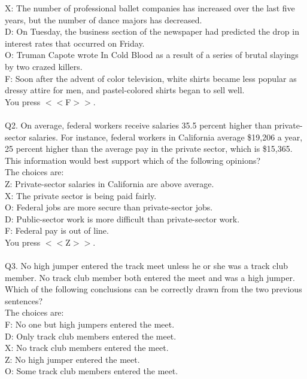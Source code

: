 \documentclass[pdflatex,sn-nature]{sn-jnl}%
\theoremstyle{thmstyleone}%
\theoremstyle{thmstyletwo}%
\theoremstyle{thmstylethree}%
\begin{document}
X: The number of professional ballet companies has increased over the last five years, but the number of dance majors has decreased. $~$\\ 
D: On Tuesday, the business section of the newspaper had predicted the drop in interest rates that occurred on Friday. $~$\\ 
O: Truman Capote wrote In Cold Blood as a result of a series of brutal slayings by two crazed killers. $~$\\ 
F: Soon after the advent of color television, white shirts became less popular as dressy attire for men, and pastel-colored shirts began to sell well. $~$\\ 
You press $<<$F$>>$. $~$\\ 
 $~$\\ 
Q2. On average, federal workers receive salaries 35.5 percent higher than private-sector salaries. For instance, federal workers in California average \$19,206 a year, 25 percent higher than the average pay in the private sector, which is \$15,365. This information would best support which of the following opinions? $~$\\ 
The choices are: $~$\\ 
Z: Private-sector salaries in California are above average. $~$\\ 
X: The private sector is being paid fairly. $~$\\ 
O: Federal jobs are more secure than private-sector jobs. $~$\\ 
D: Public-sector work is more difficult than private-sector work. $~$\\ 
F: Federal pay is out of line. $~$\\ 
You press $<<$Z$>>$. $~$\\ 
 $~$\\ 
Q3. No high jumper entered the track meet unless he or she was a track club member. No track club member both entered the meet and was a high jumper. Which of the following conclusions can be correctly drawn from the two previous sentences? $~$\\ 
The choices are: $~$\\ 
F: No one but high jumpers entered the meet. $~$\\ 
D: Only track club members entered the meet. $~$\\ 
X: No track club members entered the meet. $~$\\ 
Z: No high jumper entered the meet. $~$\\ 
O: Some track club members entered the meet. $~$\\ 
\end{document}
